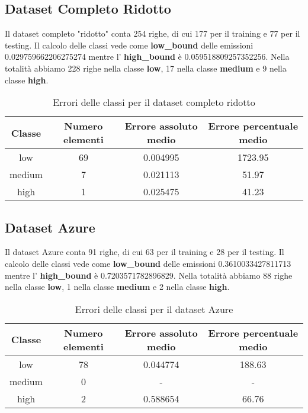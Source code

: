 \subsection{Dataset Completo Ridotto}

Il dataset completo "ridotto" conta 254 righe, di cui 177 per il training e 77 per il testing.
Il calcolo delle classi vede come \textbf{low\_bound} delle emissioni 0.029759662206275274 mentre l' \textbf{high\_bound} è 0.059518809257352256.
Nella totalità abbiamo 228 righe nella classe \textbf{low}, 17 nella classe \textbf{medium} e 9 nella classe \textbf{high}.


\begin{table}[H]
    \centering
    \begin{tabular}{|c|c|c|c|}
        \hline
        \textbf{Classe} &  \textbf{Numero elementi} & \textbf{Errore assoluto medio} & \textbf{Errore percentuale medio} \\ \hline
        low             & 69                & 0.004995                   & 1723.95            \\ \hline
        medium          & 7                & 0.021113                  & 51.97            \\ \hline
        high            & 1                & 0.025475                   & 41.23            \\ \hline
    \end{tabular}
    \caption{Errori delle classi per il dataset completo ridotto}
\end{table}


\subsection{Dataset Azure}

Il dataset Azure conta 91 righe, di cui 63 per il training e 28 per il testing.
Il calcolo delle classi vede come \textbf{low\_bound} delle emissioni 0.3610033427811713 mentre l' \textbf{high\_bound} è 0.7203571782896829.
Nella totalità abbiamo 88 righe nella classe \textbf{low}, 1 nella classe \textbf{medium} e 2 nella classe \textbf{high}.


\begin{table}[H]
    \centering
    \begin{tabular}{|c|c|c|c|}
        \hline
        \textbf{Classe} &  \textbf{Numero elementi} & \textbf{Errore assoluto medio} & \textbf{Errore percentuale medio} \\ \hline
        low             & 78                & 0.044774                   & 188.63            \\ \hline
        medium          & 0                & -                  & -            \\ \hline
        high            & 2                & 0.588654                   & 66.76            \\ \hline
    \end{tabular}
    \caption{Errori delle classi per il dataset Azure}
\end{table}

